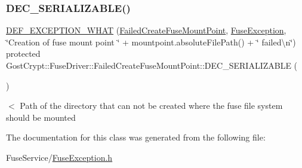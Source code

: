 \subsubsection{\texorpdfstring{D\+E\+C\+\_\+\+S\+E\+R\+I\+A\+L\+I\+Z\+A\+B\+L\+E()}{DEC\_SERIALIZABLE()}}
{\footnotesize\ttfamily \hyperlink{_gost_crypt_exception_8h_a5bc1e1c6c9d6f46c84eeba49e33355f9}{D\+E\+F\+\_\+\+E\+X\+C\+E\+P\+T\+I\+O\+N\+\_\+\+W\+H\+AT} (\hyperlink{class_gost_crypt_1_1_fuse_driver_1_1_failed_create_fuse_mount_point}{Failed\+Create\+Fuse\+Mount\+Point}, \hyperlink{class_gost_crypt_1_1_fuse_driver_1_1_fuse_exception}{Fuse\+Exception}, \char`\"{}Creation of fuse mount point \char`\"{} + mountpoint.\+absolute\+File\+Path() + \char`\"{} failed\textbackslash{}n\char`\"{}) protected Gost\+Crypt\+::\+Fuse\+Driver\+::\+Failed\+Create\+Fuse\+Mount\+Point\+::\+D\+E\+C\+\_\+\+S\+E\+R\+I\+A\+L\+I\+Z\+A\+B\+LE (\begin{DoxyParamCaption}\item[{\hyperlink{class_gost_crypt_1_1_fuse_driver_1_1_failed_create_fuse_mount_point}{Failed\+Create\+Fuse\+Mount\+Point}}]{ }\end{DoxyParamCaption})}

$<$ Path of the directory that can not be created where the fuse file system should be mounted 

The documentation for this class was generated from the following file\+:\begin{DoxyCompactItemize}
\item 
Fuse\+Service/\hyperlink{_fuse_exception_8h}{Fuse\+Exception.\+h}\end{DoxyCompactItemize}
